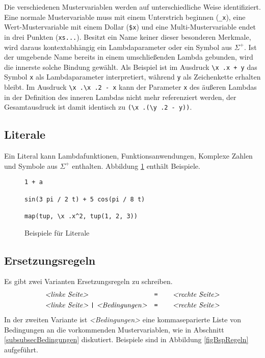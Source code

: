 Die verschiedenen Mustervariablen werden auf unterschiedliche Weise identifiziert. Eine normale Mustervariable muss mit einem Unterstrich beginnen (\verb|_x|), eine Wert-Mustervariable mit einem Dollar (\verb|$x|) und eine Multi-Mustervariable endet in drei Punkten (\verb|xs...|). Besitzt ein Name keiner dieser besonderen Merkmale, wird daraus kontextabhängig ein Lambdaparameter oder ein Symbol aus $\Sigma^+$. Ist der umgebende Name bereits in einem umschließenden Lambda gebunden, wird die innerste solche Bindung gewählt. Als Beispiel ist im Ausdruck \verb|\x .x + y| das Symbol \verb|x| als Lambdaparameter interpretiert, während \verb|y| als Zeichenkette erhalten bleibt.
Im Ausdruck \verb|\x .\x .2 - x| kann der Parameter \verb|x| des äußeren Lambdas in der Definition des inneren Lambdas nicht mehr referenziert werden, der Gesamtausdruck ist damit identisch zu \verb|(\x .(\y .2 - y))|.

\subsection{Literale}
Ein Literal kann Lambdafunktionen, Funktionsanwendungen, Komplexe Zahlen und Symbole aus $\Sigma^+$ enthalten. Abbildung \ref{figBspLit} enthält Beispiele.

\begin{figure}
\begin{verbatim}
1 + a

sin(3 pi / 2 t) + 5 cos(pi / 8 t)

map(tup, \x .x^2, tup(1, 2, 3))
\end{verbatim}
\label{figBspLit}
\caption{Beispiele für Literale}
\end{figure}

\subsection{Ersetzungsregeln}
Es gibt zwei Varianten Ersetzungsregeln zu schreiben.
\begin{align*}
	~&~&~&~&\textit{<linke Seite>}&~ ~                       &\verb~=    ~ \textit{<rechte Seite>}&~&~&~&~\\
	~&~&~&~&\textit{<linke Seite>}&~\verb~|~~\textit{<Bedingungen>} &\verb~=    ~ \textit{<rechte Seite>}&~&~&~&~
\end{align*}
In der zweiten Variante ist \textit{<Bedingungen>} eine kommaseparierte Liste von Bedingungen an die vorkommenden Mustervariablen, wie in Abschnitt \ref{subsubsecBedingungen} diskutiert. 
Beispiele sind in Abbildung \ref{figBspRegeln} aufgeführt.

